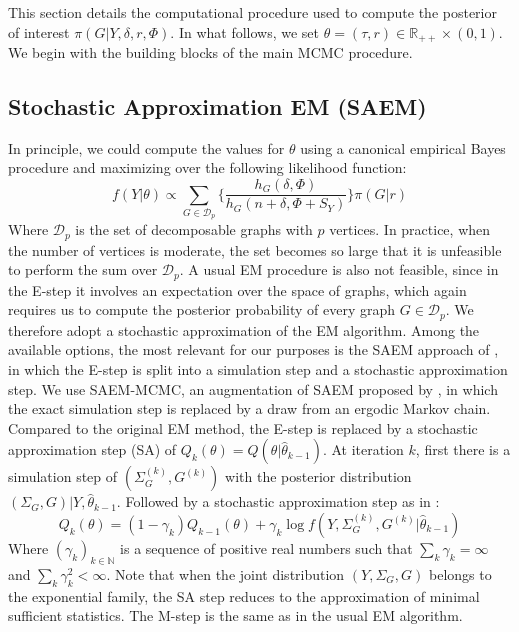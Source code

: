 This section details the computational procedure used to compute the posterior of interest $\pi(G| Y,\delta,r,\Phi)$. In what follows, we set $\theta = (\tau, r) \in \mathbb{R}_{++} \times (0,1)$. We begin with the building blocks of the main MCMC procedure.
\subsection{Stochastic Approximation EM (SAEM)}\label{subsec:saem}
In principle, we could compute the values for $\theta$ using a canonical empirical Bayes procedure and maximizing over the following likelihood function:
\begin{equation*}
    f(Y|\theta) \propto \sum_{G \in \mathcal{D}_p} \{\frac{h_G(\delta, \Phi)}{h_G(n+\delta, \Phi + S_Y)}\}\pi(G|r)
\end{equation*}
Where $\mathcal{D}_p$ is the set of decomposable graphs with $p$ vertices. In practice, when the number of vertices is moderate, the set becomes so large that it is unfeasible to perform the sum over $\mathcal{D}_p$. A usual EM procedure is also not feasible, since in the E-step it involves an expectation over the space of graphs, which again requires us to compute the posterior probability of every graph $G \in \mathcal{D}_p$. We therefore adopt a stochastic approximation of the EM algorithm. Among the available options, the most relevant for our purposes is the SAEM approach of \textcite{delyon1999convergence}, in which the E-step is split into a simulation step and a stochastic approximation step. We use SAEM-MCMC, an augmentation of SAEM proposed by \textcite{kuhn2004coupling}, in which the exact simulation step is replaced by a draw from an ergodic Markov chain.\\
Compared to the original EM method, the E-step is replaced by a stochastic approximation step (SA) of $Q_k(\theta)=Q(\theta|\hat\theta_{k-1})$. At iteration $k$, first there is a simulation step of $(\Sigma_G^{(k)}, G^{(k)})$ with the posterior distribution $(\Sigma_G,G)|Y,\hat\theta_{k-1}$. Followed by a stochastic approximation step as in \textcite{robbins1951stochastic}:
\begin{equation*}
    Q_k(\theta) = (1-\gamma_k)Q_{k-1}(\theta) + \gamma_k \log f(Y, \Sigma_G^{(k)}, G^{(k)}|\hat\theta_{k-1})
\end{equation*}
Where $(\gamma_k)_{k\in\mathbb{N}}$ is a sequence of positive real numbers such that $\sum_k \gamma_k = \infty$ and $\sum_k \gamma_k^2 < \infty$. Note that when the joint distribution $(Y, \Sigma_G , G)$ belongs to the exponential family, the SA step reduces to the approximation of minimal sufficient statistics. The M-step is the same as in the usual EM algorithm. \\
